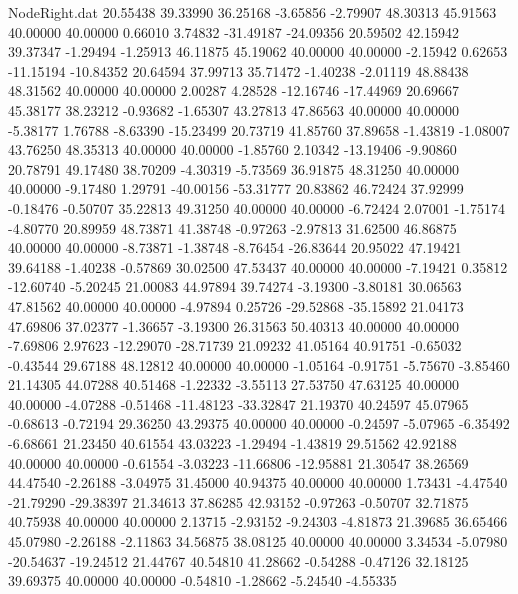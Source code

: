 \begin{filecontents}{NodeRight.dat}
  20.55438   39.33990   36.25168    -3.65856   -2.79907   48.30313   45.91563   40.00000   40.00000    0.66010    3.74832  -31.49187  -24.09356
  20.59502   42.15942   39.37347    -1.29494   -1.25913   46.11875   45.19062   40.00000   40.00000   -2.15942    0.62653  -11.15194  -10.84352
  20.64594   37.99713   35.71472    -1.40238   -2.01119   48.88438   48.31562   40.00000   40.00000    2.00287    4.28528  -12.16746  -17.44969
  20.69667   45.38177   38.23212    -0.93682   -1.65307   43.27813   47.86563   40.00000   40.00000   -5.38177    1.76788   -8.63390  -15.23499
  20.73719   41.85760   37.89658    -1.43819   -1.08007   43.76250   48.35313   40.00000   40.00000   -1.85760    2.10342  -13.19406   -9.90860
  20.78791   49.17480   38.70209    -4.30319   -5.73569   36.91875   48.31250   40.00000   40.00000   -9.17480    1.29791  -40.00156  -53.31777
  20.83862   46.72424   37.92999    -0.18476   -0.50707   35.22813   49.31250   40.00000   40.00000   -6.72424    2.07001   -1.75174   -4.80770
  20.89959   48.73871   41.38748    -0.97263   -2.97813   31.62500   46.86875   40.00000   40.00000   -8.73871   -1.38748   -8.76454  -26.83644
  20.95022   47.19421   39.64188    -1.40238   -0.57869   30.02500   47.53437   40.00000   40.00000   -7.19421    0.35812  -12.60740   -5.20245
  21.00083   44.97894   39.74274    -3.19300   -3.80181   30.06563   47.81562   40.00000   40.00000   -4.97894    0.25726  -29.52868  -35.15892
  21.04173   47.69806   37.02377    -1.36657   -3.19300   26.31563   50.40313   40.00000   40.00000   -7.69806    2.97623  -12.29070  -28.71739
  21.09232   41.05164   40.91751    -0.65032   -0.43544   29.67188   48.12812   40.00000   40.00000   -1.05164   -0.91751   -5.75670   -3.85460
  21.14305   44.07288   40.51468    -1.22332   -3.55113   27.53750   47.63125   40.00000   40.00000   -4.07288   -0.51468  -11.48123  -33.32847
  21.19370   40.24597   45.07965    -0.68613   -0.72194   29.36250   43.29375   40.00000   40.00000   -0.24597   -5.07965   -6.35492   -6.68661
  21.23450   40.61554   43.03223    -1.29494   -1.43819   29.51562   42.92188   40.00000   40.00000   -0.61554   -3.03223  -11.66806  -12.95881
  21.30547   38.26569   44.47540    -2.26188   -3.04975   31.45000   40.94375   40.00000   40.00000    1.73431   -4.47540  -21.79290  -29.38397
  21.34613   37.86285   42.93152    -0.97263   -0.50707   32.71875   40.75938   40.00000   40.00000    2.13715   -2.93152   -9.24303   -4.81873
  21.39685   36.65466   45.07980    -2.26188   -2.11863   34.56875   38.08125   40.00000   40.00000    3.34534   -5.07980  -20.54637  -19.24512
  21.44767   40.54810   41.28662    -0.54288   -0.47126   32.18125   39.69375   40.00000   40.00000   -0.54810   -1.28662   -5.24540   -4.55335

\end{filecontents}
